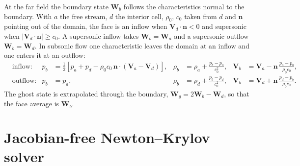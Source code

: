 \documentclass[12pt,a4paper]{article}
\begin{document}
At the far field the boundary state $\mathbf{W}_b$ follows the characteristics normal to the
boundary. With $a$ the free stream, $d$ the interior cell, $\rho_0$, $c_0$ taken from $d$ and
$\mathbf{n}$ pointing out of the domain, the face is an inflow when $\mathbf{V}_d\cdot\mathbf{n}<0$
and supersonic when $|\mathbf{V}_d\cdot\mathbf{n}|\ge c_0$. A supersonic inflow takes
$\mathbf{W}_b=\mathbf{W}_a$ and a supersonic outflow $\mathbf{W}_b=\mathbf{W}_d$. In subsonic
flow one characteristic leaves the domain at an inflow and one enters it at an outflow:
\begin{equation}
  \begin{aligned}
    &\text{inflow:} &
    p_b&=\tfrac12\left[p_a+p_d-\rho_0c_0\,\mathbf{n}\cdot(\mathbf{V}_a-\mathbf{V}_d)\right], &
    \rho_b&=\rho_a+\frac{p_b-p_a}{c_0^2}, &
    \mathbf{V}_b&=\mathbf{V}_a-\mathbf{n}\,\frac{p_a-p_b}{\rho_0c_0},\\
    &\text{outflow:} &
    p_b&=p_a, &
    \rho_b&=\rho_d+\frac{p_b-p_d}{c_0^2}, &
    \mathbf{V}_b&=\mathbf{V}_d+\mathbf{n}\,\frac{p_d-p_b}{\rho_0c_0}.
  \end{aligned}
  \label{eq:farfield}
\end{equation}
The ghost state is extrapolated through the boundary, $\mathbf{W}_g=2\mathbf{W}_b-\mathbf{W}_d$,
so that the face average is $\mathbf{W}_b$.

\clearpage
\section{Jacobian-free Newton--Krylov solver}\label{app:gmres}
\end{document}

